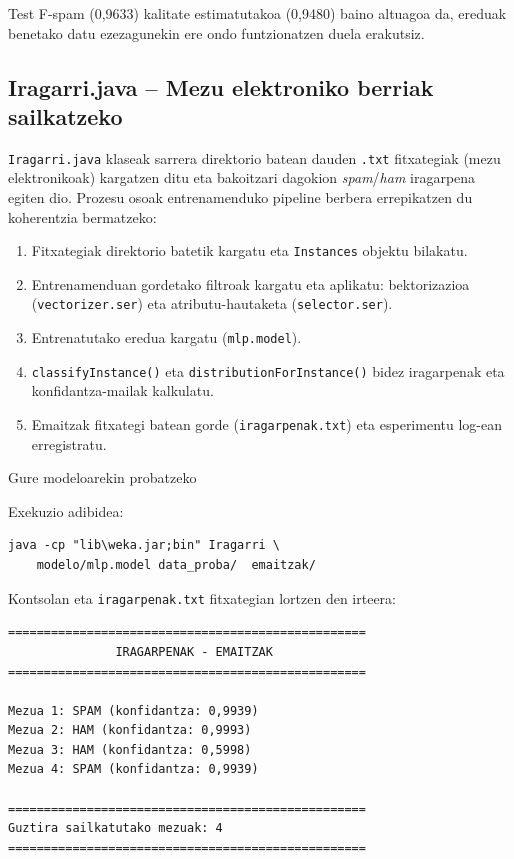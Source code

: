 \documentclass[12pt, a4paper]{article}
\begin{document}
Test F-spam (0,9633) kalitate estimatutakoa (0,9480) baino altuagoa da,
ereduak benetako datu ezezagunekin ere ondo funtzionatzen duela erakutsiz.

\subsection{Iragarri.java -- Mezu elektroniko berriak sailkatzeko}

\texttt{Iragarri.java} klaseak sarrera direktorio batean dauden \texttt{.txt} fitxategiak (mezu elektronikoak) kargatzen ditu eta bakoitzari dagokion \textit{spam}/\textit{ham} iragarpena egiten dio. Prozesu osoak entrenamenduko pipeline berbera errepikatzen du koherentzia bermatzeko:

\begin{enumerate}
    \item Fitxategiak direktorio batetik kargatu eta \texttt{Instances} objektu bilakatu.
    \item Entrenamenduan gordetako filtroak kargatu eta aplikatu: bektorizazioa (\texttt{vectorizer.ser}) eta atributu-hautaketa (\texttt{selector.ser}).
    \item Entrenatutako eredua kargatu (\texttt{mlp.model}).
    \item \texttt{classifyInstance()} eta \texttt{distributionForInstance()} bidez iragarpenak eta konfidantza-mailak kalkulatu.
    \item Emaitzak fitxategi batean gorde (\texttt{iragarpenak.txt}) eta esperimentu log-ean erregistratu.
\end{enumerate}

Gure modeloarekin probatzeko

Exekuzio adibidea:
\begin{verbatim}
java -cp "lib\weka.jar;bin" Iragarri \
    modelo/mlp.model data_proba/  emaitzak/
\end{verbatim}

Kontsolan eta \texttt{iragarpenak.txt} fitxategian lortzen den irteera:
\begin{verbatim}
==================================================
               IRAGARPENAK - EMAITZAK             
==================================================

Mezua 1: SPAM (konfidantza: 0,9939)
Mezua 2: HAM (konfidantza: 0,9993)
Mezua 3: HAM (konfidantza: 0,5998)
Mezua 4: SPAM (konfidantza: 0,9939)

==================================================
Guztira sailkatutako mezuak: 4
==================================================
\end{verbatim}
\end{document}
